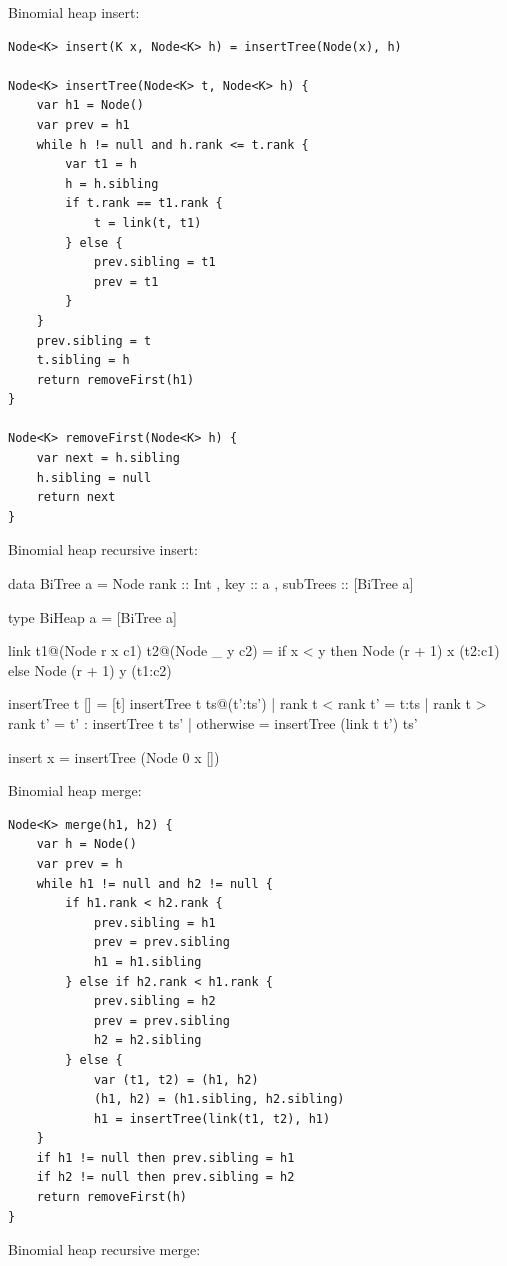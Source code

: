\documentclass[b5paper]{article}
\begin{document}
Binomial heap insert:

\begin{lstlisting}[language = Bourbaki]
Node<K> insert(K x, Node<K> h) = insertTree(Node(x), h)

Node<K> insertTree(Node<K> t, Node<K> h) {
    var h1 = Node()
    var prev = h1
    while h != null and h.rank <= t.rank {
        var t1 = h
        h = h.sibling
        if t.rank == t1.rank {
            t = link(t, t1)
        } else {
            prev.sibling = t1
            prev = t1
        }
    }
    prev.sibling = t
    t.sibling = h
    return removeFirst(h1)
}

Node<K> removeFirst(Node<K> h) {
    var next = h.sibling
    h.sibling = null
    return next
}
\end{lstlisting}

Binomial heap recursive insert:

\begin{Haskell}
data BiTree a = Node { rank :: Int
                     , key :: a
                     , subTrees :: [BiTree a]}

type BiHeap a = [BiTree a]

link t1@(Node r x c1) t2@(Node _ y c2) =
    if x < y then Node (r + 1) x (t2:c1)
    else Node (r + 1) y (t1:c2)

insertTree t [] = [t]
insertTree t ts@(t':ts') | rank t < rank t' = t:ts
                         | rank t > rank t' = t' : insertTree t ts'
                         | otherwise = insertTree (link t t') ts'

insert x = insertTree (Node 0 x [])
\end{Haskell}

Binomial heap merge:

\begin{lstlisting}[language = Bourbaki]
Node<K> merge(h1, h2) {
    var h = Node()
    var prev = h
    while h1 != null and h2 != null {
        if h1.rank < h2.rank {
            prev.sibling = h1
            prev = prev.sibling
            h1 = h1.sibling
        } else if h2.rank < h1.rank {
            prev.sibling = h2
            prev = prev.sibling
            h2 = h2.sibling
        } else {
            var (t1, t2) = (h1, h2)
            (h1, h2) = (h1.sibling, h2.sibling)
            h1 = insertTree(link(t1, t2), h1)
    }
    if h1 != null then prev.sibling = h1
    if h2 != null then prev.sibling = h2
    return removeFirst(h)
}
\end{lstlisting}

Binomial heap recursive merge:
\end{document}

